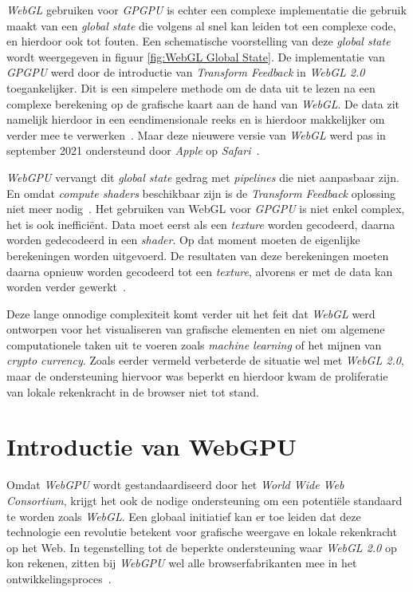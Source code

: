 \textit{WebGL} gebruiken voor \textit{GPGPU} is echter een complexe implementatie die gebruik maakt van een \textit{global state} die volgens \textcite{Surma2022} al snel kan leiden tot een complexe code, en hierdoor ook tot fouten. Een schematische voorstelling van deze \textit{global state} wordt weergegeven in figuur \ref{fig:WebGL Global State}. De implementatie van \textit{GPGPU} werd door de introductie van \textit{Transform Feedback} in \textit{WebGL 2.0} toegankelijker. Dit is een simpelere methode om de data uit te lezen na een complexe berekening op de grafische kaart aan de hand van \textit{WebGL}. De data zit namelijk hierdoor in een eendimensionale reeks en is hierdoor makkelijker om verder mee te verwerken~\autocite{Tavares2021}. Maar deze nieuwere versie van \textit{WebGL} werd pas in september 2021 ondersteund door \textit{Apple} op \textit{Safari}~\autocite{Surma2022}.

\bigbreak{}

\textit{WebGPU} vervangt dit \textit{global state} gedrag met \textit{pipelines} die niet aanpasbaar zijn. En omdat \textit{compute shaders} beschikbaar zijn is de \textit{Transform Feedback} oplossing niet meer nodig~\autocite{Beaufort2023}. Het gebruiken van WebGL voor \textit{GPGPU} is niet enkel complex, het is ook inefficiënt. Data moet eerst als een \textit{texture} worden gecodeerd, daarna worden gedecodeerd in een \textit{shader}. Op dat moment moeten de eigenlijke berekeningen worden uitgevoerd. De resultaten van deze berekeningen moeten daarna opnieuw worden gecodeerd tot een \textit{texture}, alvorens er met de data kan worden verder gewerkt~\autocite{Surma2022}.

\bigbreak{}

Deze lange onnodige complexiteit komt verder uit het feit dat \textit{WebGL} werd ontworpen voor het visualiseren van grafische elementen en niet om algemene computationele taken uit te voeren zoals \textit{machine learning} of het mijnen van \textit{crypto currency}. Zoals eerder vermeld verbeterde de situatie wel met \textit{WebGL 2.0}, maar de ondersteuning hiervoor was beperkt en hierdoor kwam de proliferatie van lokale rekenkracht in de browser niet tot stand.

\break{}

\section{Introductie van WebGPU}
\label{sec:IntroWebGPU}

Omdat \textit{WebGPU} wordt gestandaardiseerd door het \textit{World Wide Web Consortium}, krijgt het ook de nodige ondersteuning om een potentiële standaard te worden zoals \textit{WebGL}. Een globaal initiatief kan er toe leiden dat deze technologie een revolutie betekent voor grafische weergave en lokale rekenkracht op het Web. In tegenstelling tot de beperkte ondersteuning waar \textit{WebGL 2.0} op kon rekenen, zitten bij \textit{WebGPU} wel alle browserfabrikanten mee in het ontwikkelingsproces~\autocite{Surma2022}.

